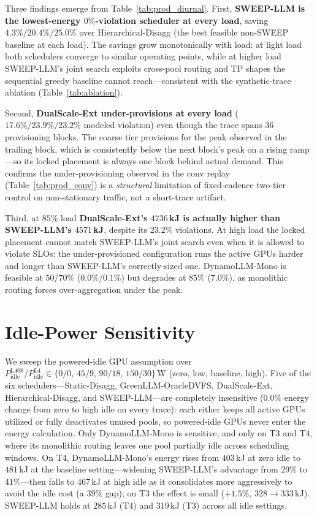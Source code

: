 Three findings emerge from Table~\ref{tab:prod_diurnal}. First, \textbf{SWEEP-LLM is the lowest-energy $0\%$-violation scheduler at every load}, saving $4.3\%/20.4\%/25.0\%$ over Hierarchical-Disagg (the best feasible non-SWEEP baseline at each load). The savings grow monotonically with load: at light load both schedulers converge to similar operating points, while at higher load SWEEP-LLM's joint search exploits cross-pool routing and TP shapes the sequential greedy baseline cannot reach---consistent with the synthetic-trace ablation (Table~\ref{tab:ablation}).

Second, \textbf{DualScale-Ext under-provisions at every load} ($17.6\%/23.9\%/23.2\%$ modeled violation) even though the trace spans $36$ provisioning blocks. The coarse tier provisions for the peak observed in the trailing block, which is consistently below the next block's peak on a rising ramp---so its locked placement is always one block behind actual demand. This confirms the under-provisioning observed in the conv replay (Table~\ref{tab:prod_conv}) is a \emph{structural} limitation of fixed-cadence two-tier control on non-stationary traffic, not a short-trace artifact.

Third, at $85\%$ load \textbf{DualScale-Ext's $4736$\,kJ is actually higher than SWEEP-LLM's $4571$\,kJ}, despite its $23.2\%$ violations. At high load the locked placement cannot match SWEEP-LLM's joint search even when it is allowed to violate SLOs: the under-provisioned configuration runs the active GPUs harder and longer than SWEEP-LLM's correctly-sized one. DynamoLLM-Mono is feasible at $50/70\%$ ($0.0\%/0.1\%$) but degrades at $85\%$ ($7.0\%$), as monolithic routing forces over-aggregation under the peak.


\section{Idle-Power Sensitivity}
\label{sec:eval_idle}

We sweep the powered-idle GPU assumption over $P_{\mathrm{idle}}^{\mathrm{L40S}}/P_{\mathrm{idle}}^{\mathrm{L4}} \in \{0/0,\,45/9,\,90/18,\,150/30\}$\,W (zero, low, baseline, high).
Five of the six schedulers---Static-Disagg, GreenLLM-OracleDVFS, DualScale-Ext, Hierarchical-Disagg, and SWEEP-LLM---are completely insensitive ($0.0\%$ energy change from zero to high idle on every trace): each either keeps all active GPUs utilized or fully deactivates unused pools, so powered-idle GPUs never enter the energy calculation.
Only DynamoLLM-Mono is sensitive, and only on T3 and T4, where its monolithic routing leaves one pool partially idle across scheduling windows.
On T4, DynamoLLM-Mono's energy rises from $403$\,kJ at zero idle to $481$\,kJ at the baseline setting---widening SWEEP-LLM's advantage from $29\%$ to $41\%$---then falls to $467$\,kJ at high idle as it consolidates more aggressively to avoid the idle cost (a $39\%$ gap); on T3 the effect is small ($+1.5\%$, $328{\to}333$\,kJ).
SWEEP-LLM holds at $285$\,kJ (T4) and $319$\,kJ (T3) across all idle settings.


